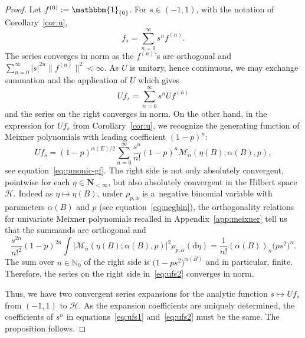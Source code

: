 \documentclass[10pt,a4paper]{amsart}
\numberwithin{equation}{section}
\newcommand{\N}{\mathbb{N}}
\newcommand{\dd}{\mathrm{d}} %
\newcommand{\1}{\mathbbm{1}}
\begin{document}
\begin{proof}
	Let $f^{(0)}:= \1_{\{0\}}$. For $s\in (-1,1)$, with the notation of Corollary~\ref{cor:u},
	\[
		f_s = \sum_{n=0}^\infty s^n f^{(n)}.
	\]
	The series converges in norm as the $f^{(n)}$'s are orthogonal and $\sum_{n=0}^\infty |s|^{2n} \bigl\|f^{(n)}\bigr\|^2<\infty$. As $U$ is unitary, hence continuous, we may exchange summation and the application of $U$ which gives
	\begin{equation} \label{eq:ufs1}
		U f_s = \sum_{n=0}^\infty s^n U f^{(n)}
	\end{equation}
	and the series on the right converges in norm. On the other hand, in the expression for $U f_s$ from Corollary~\ref{cor:u}, we recognize the generating function of Meixner polynomials with leading coefficient $(1-p)^n$:
	\begin{equation} \label{eq:ufs2}
		U f_s = (1-p)^{\alpha(E)/2} \sum_{n=0}^\infty \frac{s^n}{n!} (1-p)^n \mathcal M_n( \eta(B);\alpha(B),p),
	\end{equation}
	see equation~\eqref{eq:pmonic-gf}. The right side is not only absolutely convergent, pointwise for each $\eta\in \mathbf N_{<\infty}$, but also absolutely convergent in the Hilbert space $\mathcal H$. Indeed as $\eta\mapsto \eta(B)$, under $\rho_{p,\alpha}$ is a~negative binomial variable with parameters $\alpha(B)$ and $p$ (see equation~\eqref{eq:negbin}), the orthogonality relations for univariate Meixner polynomials recalled in Appendix~\ref{app:meixner} tell us that the summands are orthogonal and
	\[
		\frac{s^{2n}}{n!^2} (1-p)^{2n} \int|\mathcal M_n( \eta(B);\alpha(B),p)|^2 \rho_{p,\alpha}(\dd \eta)
		 = \frac{1}{n!} (\alpha(B))_n \bigl(p s^2\bigr)^{n}.
	\]
	The sum over $n\in \N_0$ of the right side is $\bigl(1-ps^2\bigr)^{\alpha(B)}$ and in particular, finite. Therefore, the series on the right side in~\eqref{eq:ufs2} converges in norm.
	
	Thus, we have two convergent series expansions for the analytic function $s\mapsto U f_s$ from $(-1,1)$ to $\mathcal H$. As the expansion coefficients are uniquely determined, the coefficients of $s^n$ in equations~\eqref{eq:ufs1} and~\eqref{eq:ufs2} must be the same. The proposition follows.
\end{proof}
\end{document}
